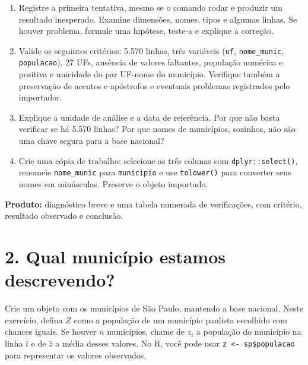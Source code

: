 \documentclass[
  brazilian,
  11pt,
  a4paper]{article}
\providecommand{\tightlist}{%
  \setlength{\itemsep}{0pt}\setlength{\parskip}{0pt}}
\begin{document}
\begin{enumerate}
\def\labelenumi{\alph{enumi}.}
\tightlist
\item
  Registre a primeira tentativa, mesmo se o comando rodar e produzir um
  resultado inesperado. Examine dimensões, nomes, tipos e algumas
  linhas. Se houver problema, formule uma hipótese, teste-a e explique a
  correção.
\item
  Valide os seguintes critérios: 5.570 linhas, três variáveis
  (\texttt{uf}, \texttt{nome\_munic}, \texttt{populacao}), 27 UFs,
  ausência de valores faltantes, população numérica e positiva e
  unicidade do par UF-nome do município. Verifique também a preservação
  de acentos e apóstrofos e eventuais problemas registrados pelo
  importador.
\item
  Explique a unidade de análise e a data de referência. Por que não
  basta verificar se há 5.570 linhas? Por que nomes de municípios,
  sozinhos, não são uma chave segura para a base nacional?
\item
  Crie uma cópia de trabalho: selecione as três colunas com
  \texttt{dplyr::select()}, renomeie \texttt{nome\_munic} para
  \texttt{municipio} e use \texttt{tolower()} para converter seus nomes
  em minúsculas. Preserve o objeto importado.
\end{enumerate}

\textbf{Produto:} diagnóstico breve e uma tabela numerada de
verificações, com critério, resultado observado e conclusão.

\section{2. Qual município estamos
descrevendo?}\label{qual-municuxedpio-estamos-descrevendo}

Crie um objeto com os municípios de São Paulo, mantendo a base nacional.
Neste exercício, defina \(Z\) como a população de um município paulista
escolhido com chances iguais. Se houver \(n\) municípios, chame de
\(z_i\) a população do município na linha \(i\) e de \(\bar z\) a média
desses valores. No R, você pode usar
\texttt{z\ \textless{}-\ sp\$populacao} para representar os valores
observados.
\end{document}
